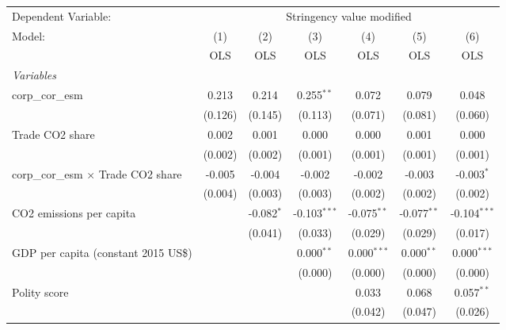 
\begingroup
\centering
\begin{tabular}{lcccccc}
   \toprule
   Dependent Variable: & \multicolumn{6}{c}{Stringency value modified}\\
   Model:                                     & (1)     & (2)          & (3)            & (4)           & (5)           & (6)\\  
                                              &  OLS    & OLS          & OLS            & OLS           & OLS           & OLS\\  
   \midrule
   \emph{Variables}\\
   corp\_cor\_esm                             & 0.213   & 0.214        & 0.255$^{**}$   & 0.072         & 0.079         & 0.048\\   
                                              & (0.126) & (0.145)      & (0.113)        & (0.071)       & (0.081)       & (0.060)\\   
   Trade CO2 share                            & 0.002   & 0.001        & 0.000          & 0.000         & 0.001         & 0.000\\   
                                              & (0.002) & (0.002)      & (0.001)        & (0.001)       & (0.001)       & (0.001)\\   
   corp\_cor\_esm $\times$ Trade CO2 share    & -0.005  & -0.004       & -0.002         & -0.002        & -0.003        & -0.003$^{*}$\\   
                                              & (0.004) & (0.003)      & (0.003)        & (0.002)       & (0.002)       & (0.002)\\   
   CO2 emissions per capita                   &         & -0.082$^{*}$ & -0.103$^{***}$ & -0.075$^{**}$ & -0.077$^{**}$ & -0.104$^{***}$\\   
                                              &         & (0.041)      & (0.033)        & (0.029)       & (0.029)       & (0.017)\\   
   GDP per capita (constant 2015 US\$)        &         &              & 0.000$^{**}$   & 0.000$^{***}$ & 0.000$^{**}$  & 0.000$^{***}$\\   
                                              &         &              & (0.000)        & (0.000)       & (0.000)       & (0.000)\\   
   Polity score                               &         &              &                & 0.033         & 0.068         & 0.057$^{**}$\\   
                                              &         &              &                & (0.042)       & (0.047)       & (0.026)\\   

\end{tabular}
